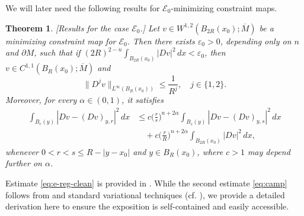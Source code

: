 \documentclass[11pt]{amsart}
\newcommand{\cE}{{\mathcal E}}
\newcommand{\e}{\varepsilon}
\theoremstyle{plain}
\newtheorem{thm}{Theorem}[section]
\theoremstyle{definition}
\theoremstyle{remark}
\numberwithin{equation}{section}
\begin{document}
We will later need the following results for $\cE_0$-minimizing constraint maps. 


\begin{thm}
    \label{thm:e-reg-clean}[Results for the case \texorpdfstring{$\cE_0$}{cE_o}.]
    Let $v\in W^{1,2}(B_{2R}(x_0);\overline M)$ be a minimizing constraint map for $\cE_0$. Then there exists $\e_0 > 0$, depending only on $n$ and $\partial M$, such that if $(2R)^{2-n}\int_{B_{2R}(x_0)} |Dv|^2\,dx < \e_0$, then $v\in C^{1,1}(B_R(x_0);\overline M)$ and 
    \begin{equation}
        \label{eq:e-reg-clean}
        \| D^j v \|_{L^\infty(B_R(x_0))} \leq \frac{1}{R^j},\quad j\in\{1,2\}.
    \end{equation}
    Moreover, for every $\alpha\in(0,1)$, it satisfies 
    \begin{equation}
        \label{eq:camp}
        \begin{aligned}
            \int_{B_r(y)} |Dv -(Dv)_{y,r}|^2\,dx &\leq c\bigg(\frac{r}{s}\bigg)^{n+2\alpha}\int_{B_s(y)} |Dv - (Dv)_{y,s}|^2\,dx\\
            &\quad + c\bigg(\frac{r}{R}\bigg)^{n+2\alpha}\int_{B_{2R}(x_0)} |Dv|^2\,dx,
        \end{aligned}
    \end{equation}
    whenever $0<r<s\leq R - |y-x_0|$ and $y\in B_R(x_0)$, where $c > 1$ may depend further on $\alpha$. 
\end{thm}



Estimate \eqref{eq:e-reg-clean} is provided in \cite[Theorem 2.4]{FGKS2}. While the second estimate \eqref{eq:camp} follows from \cite[Proposition 1]{L} and standard variational techniques (cf. \cite[Theorem 9.7]{GM}), we provide a detailed derivation here to ensure the exposition is self-contained and easily accessible.
\end{document}
